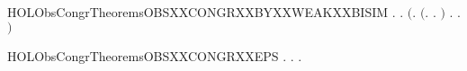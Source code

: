 \begin{SaveVerbatim}{HOLObsCongrTheoremsOBSXXCONGRXXBYXXWEAKXXBISIM}
\HOLTokenTurnstile{} \HOLSymConst{\HOLTokenForall{}}.
         \HOLSymConst{\HOLTokenImp{}}
       \HOLSymConst{\HOLTokenForall{}} .
           \ensuremath{(}\HOLSymConst{\HOLTokenForall{}}.
                \ensuremath{(}\HOLSymConst{\HOLTokenForall{}}.  \HOLTokenTransBegin{}\HOLTokenTransEnd {} \HOLSymConst{\HOLTokenImp{}} \HOLSymConst{\HOLTokenExists{}}.  \HOLTokenWeakTransBegin{}\HOLTokenWeakTransEnd {} \HOLSymConst{\HOLTokenConj{}}   \ensuremath{)} \HOLSymConst{\HOLTokenConj{}}
                \HOLSymConst{\HOLTokenForall{}}.  \HOLTokenTransBegin{}\HOLTokenTransEnd {} \HOLSymConst{\HOLTokenImp{}} \HOLSymConst{\HOLTokenExists{}}.  \HOLTokenWeakTransBegin{}\HOLTokenWeakTransEnd {} \HOLSymConst{\HOLTokenConj{}}   \ensuremath{)} \HOLSymConst{\HOLTokenImp{}}
             
\end{SaveVerbatim}
\newcommand{\HOLObsCongrTheoremsOBSXXCONGRXXBYXXWEAKXXBISIM}{\UseVerbatim{HOLObsCongrTheoremsOBSXXCONGRXXBYXXWEAKXXBISIM}}
\begin{SaveVerbatim}{HOLObsCongrTheoremsOBSXXCONGRXXEPS}
\HOLTokenTurnstile{} \HOLSymConst{\HOLTokenForall{}} .
          \HOLSymConst{\HOLTokenImp{}}
       \HOLSymConst{\HOLTokenForall{}}.    \HOLSymConst{\HOLTokenImp{}} \HOLSymConst{\HOLTokenExists{}}.    \HOLSymConst{\HOLTokenConj{}}   
\end{SaveVerbatim}
\newcommand{\HOLObsCongrTheoremsOBSXXCONGRXXEPS}{\UseVerbatim{HOLObsCongrTheoremsOBSXXCONGRXXEPS}}
